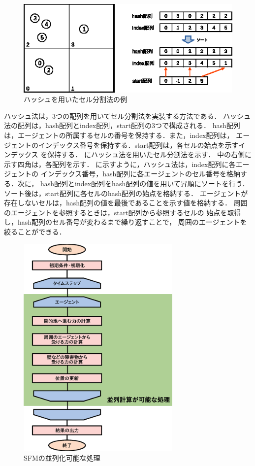 \begin{figure}[t]
 \begin{center}
  \includegraphics[width=11.5cm,clip]{figure/serubunkatu_hash.eps}
  \caption{ハッシュを用いたセル分割法の例}
  \label{fig:hash}
 \end{center}
\end{figure}

ハッシュ法は，3つの配列を用いてセル分割法を実装する方法である．
ハッシュ法の配列は，hash配列とindex配列，start配列の3つで構成される．
hash配列は，エージェントの所属するセルの番号を保持する．また，index配列は，
エージェントのインデックス番号を保持する．start配列は，各セルの始点を示すインデックス
を保持する．
にハッシュ法を用いたセル分割法を示す．
中の右側に示す四角は，各配列を示す．
に示すように，ハッシュ法は，index配列に各エージェントの
インデックス番号，hash配列に各エージェントのセル番号を格納する．次に，
hash配列とindex配列をhash配列の値を用いて昇順にソートを行う．
ソート後は，start配列に各セルのhash配列の始点を格納する．
エージェントが存在しないセルは，hash配列の値を最後であることを示す値を格納する．
周囲のエージェントを参照するときは，start配列から参照するセルの
始点を取得し，hash配列のセル番号が変わるまで繰り返すことで，
周囲のエージェントを絞ることができる．


\begin{figure}[t]
 \begin{center}
  \includegraphics[width=8cm,clip]{figure/heiretuka_sfm.eps}
  \caption{SFMの並列化可能な処理}
  \label{fig:sfm_heiretu}
 \end{center}
\end{figure}

